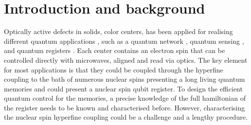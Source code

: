 \documentclass[%
 reprint,
superscriptaddress,
 amsmath,amssymb,
 aps,
]{revtex4-2}
\begin{document}
\maketitle
\section{Introduction and background}
Optically active defects in solids, color centers, has been applied for realising different quantum applications \cite{awschalom2018quantum}, such as a quantum network \cite{pompili2021realization}, quantum sensing \cite{degen2017quantum}, and quantum registers \cite{bradley2019ten}. 
Each center contains an electron spin that can be controlled directly with microwaves, aligned and read via optics. 
The key element for most applications is that they could be coupled through the hyperfine coupling to the bath of numerous nuclear spins presenting a long living quantum memories and could present a nuclear spin qubit register. 
To design the efficient quantum control for the memories, a precise knowledge of the full hamiltonian of the register needs to be known and characterised before. 
However, characterising the nuclear spin hyperfine coupling could be a challenge and a lengthy procedure. 
\end{document}
